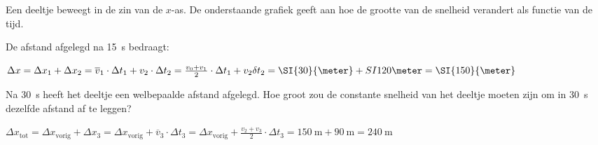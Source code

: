 \documentclass{ximera}
\begin{document}
\begin{exercise}
Een deeltje beweegt in de zin van de $x$-as. De onderstaande grafiek geeft aan hoe de grootte van de snelheid verandert als functie van de tijd.
\begin{image}
    \end{image}



\begin{question}
De afstand afgelegd na \SI{15}{s} bedraagt:
\begin{feedback}
    \(\Delta x = \Delta x_1 + \Delta x_2  = \overline{v}_1\cdot \Delta t_1 + v_2\cdot \Delta t_2 = \frac{v_0 + v_1}{2} \cdot \Delta t_1 + v_2 \delta t_2 = \SI{30}{\meter} + SI{120}{\meter} = \SI{150}{\meter}\)
\end{feedback}
\end{question}

\begin{question}
Na \SI{30}{s} heeft het deeltje een welbepaalde afstand afgelegd. Hoe groot zou de constante snelheid van het deeltje moeten zijn om in \SI{30}{s} dezelfde afstand af te leggen?

\begin{feedback}
    \(\Delta x_{\text{tot}} = \Delta x_{\text{vorig}} + \Delta x_3 = \Delta x_{\text{vorig}} + \overline{v}_3 \cdot \Delta t_3  = \Delta x_{\text{vorig}} + \frac{v_2 + v_3}{2} \cdot \Delta t_3 = \SI{150}{\meter} + \SI{90}{\meter} = \SI{240}{\meter}\)


\end{feedback}
\end{question}
\end{exercise}
\end{document}
